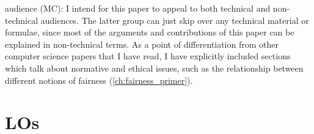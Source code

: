 \begin{itemize}

\hashtag audience (MC): I intend for this paper to appeal to both technical and non-technical audiences. The latter group can just skip over any technical material or formulae, since most of the arguments and contributions of this paper can be explained in non-technical terms. As a point of differentiation from other computer science papers that I have read, I have explicitly included sections which talk about normative and ethical issues, such as the relationship between different notions of fairness (\autoref{ch:fairness_primer}).


\end{itemize}

\section{LOs}

